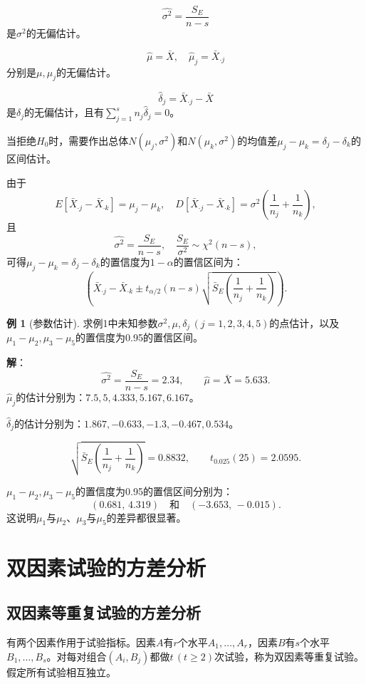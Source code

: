\documentclass[11pt,a4paper]{report}
\theoremstyle{definition}
\newtheorem{example}{例}[chapter]
\begin{document}
\[
\widehat{\sigma^{2}}=\frac{S_{E}}{n-s}
\]
是$\sigma^{2}$的无偏估计。

\[
\widehat{\mu}=\bar{X},\quad\widehat{\mu}_{j}=\bar{X}_{\cdot j}
\]
分别是$\mu,\mu_{j}$的无偏估计。

\[
\widehat{\delta}_{j}=\bar{X}_{\cdot j}-\bar{X}
\]
是$\delta_{j}$的无偏估计，且有$\displaystyle\sum_{j=1}^{s}n_{j}\widehat{\delta}_{j}=0$。

当拒绝$H_{0}$时，需要作出总体$N(\mu_{j},\sigma^{2})$和$N(\mu_{k},\sigma^{2})$的均值差$\mu_{j}-\mu_{k}=\delta_{j}-\delta_{k}$的区间估计。

由于
\[
E[\bar{X}_{\cdot j}-\bar{X}_{\cdot k}]=\mu_{j}-\mu_{k},\quad D[\bar{X}_{\cdot j}-\bar{X}_{\cdot k}]=\sigma^{2}\left(\frac{1}{n_{j}}+\frac{1}{n_{k}}\right),
\]
且
\[
\widehat{\sigma^{2}}=\frac{S_{E}}{n-s},\quad\frac{S_{E}}{\sigma^{2}}\sim\chi^{2}(n-s),
\]
可得$\mu_{j}-\mu_{k}=\delta_{j}-\delta_{k}$的置信度为$1-\alpha$的置信区间为：
\[
\left(\bar{X}_{\cdot j}-\bar{X}_{\cdot k}\pm t_{\alpha/2}(n-s)\sqrt{\bar{S}_{E}\left(\frac{1}{n_{j}}+\frac{1}{n_{k}}\right)}\right).
\]

\begin{example}[参数估计]
求例1中未知参数$\sigma^{2},\mu,\delta_{j}\,(j=1,2,3,4,5)$的点估计，以及$\mu_{1}-\mu_{2},\mu_{3}-\mu_{5}$的置信度为0.95的置信区间。

\textbf{解}：
\[
\widehat{\sigma^{2}}=\frac{S_{E}}{n-s}=2.34,\qquad\widehat{\mu}=\bar{X}=5.633.
\]
$\widehat{\mu}_{j}$的估计分别为：$7.5,5,4.333,5.167,6.167$。

$\widehat{\delta}_{j}$的估计分别为：$1.867,-0.633,-1.3,-0.467,0.534$。

\[
\sqrt{\bar{S}_{E}\left(\frac{1}{n_{j}}+\frac{1}{n_{k}}\right)}=0.8832,\qquad t_{0.025}(25)=2.0595.
\]

$\mu_{1}-\mu_{2},\mu_{3}-\mu_{5}$的置信度为0.95的置信区间分别为：
\[
(0.681,\,4.319)\quad\text{和}\quad(-3.653,\,-0.015).
\]
这说明$\mu_{1}$与$\mu_{2}$、$\mu_{3}$与$\mu_{5}$的差异都很显著。
\end{example}

\section{双因素试验的方差分析}

\subsection{双因素等重复试验的方差分析}

有两个因素作用于试验指标。因素$A$有$r$个水平$A_{1},\ldots,A_{r}$，因素$B$有$s$个水平$B_{1},\ldots,B_{s}$。对每对组合$(A_{i},B_{j})$都做$t\,(t\geq 2)$次试验，称为双因素等重复试验。假定所有试验相互独立。
\end{document}
